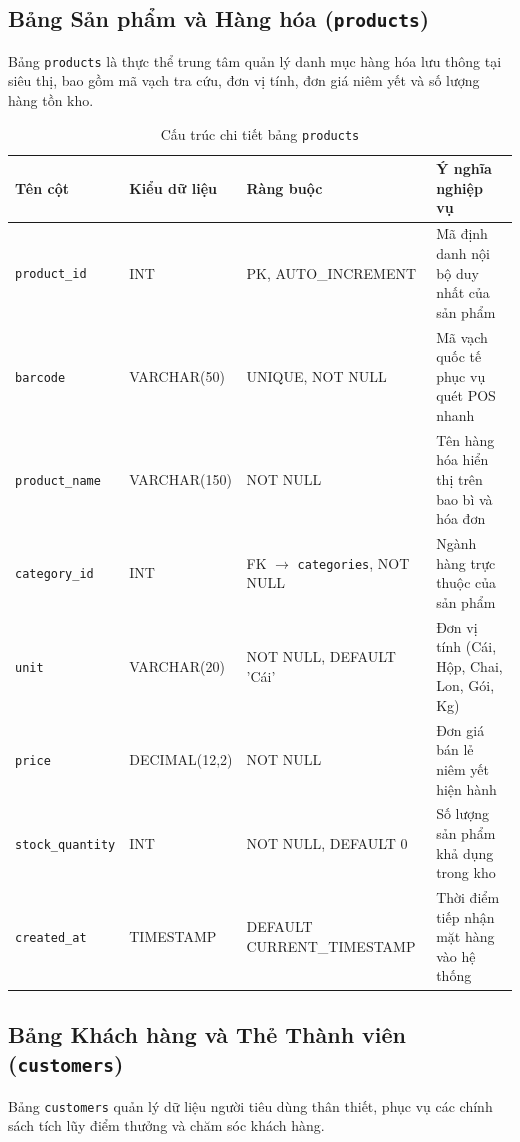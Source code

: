 \documentclass[12pt,a4paper]{report}
\begin{document}
\subsection{Bảng Sản phẩm và Hàng hóa (\texttt{products})}
Bảng \texttt{products} là thực thể trung tâm quản lý danh mục hàng hóa lưu thông tại siêu thị, bao gồm mã vạch tra cứu, đơn vị tính, đơn giá niêm yết và số lượng hàng tồn kho.

\begin{table}[H]
\centering
\footnotesize
\caption{Cấu trúc chi tiết bảng \texttt{products}}
\label{tab:dict_products}
\vspace{0.2cm}
\begin{tabularx}{\textwidth}{L{3.3cm} L{2.9cm} L{3.6cm} Y}
\toprule
\textbf{Tên cột} & \textbf{Kiểu dữ liệu} & \textbf{Ràng buộc} & \textbf{Ý nghĩa nghiệp vụ} \\
\midrule
\texttt{product\_id} & INT & PK, AUTO\_INCREMENT & Mã định danh nội bộ duy nhất của sản phẩm \\
\texttt{barcode} & VARCHAR(50) & UNIQUE, NOT NULL & Mã vạch quốc tế phục vụ quét POS nhanh \\
\texttt{product\_name} & VARCHAR(150) & NOT NULL & Tên hàng hóa hiển thị trên bao bì và hóa đơn \\
\texttt{category\_id} & INT & FK $\to$ \texttt{categories}, NOT NULL & Ngành hàng trực thuộc của sản phẩm \\
\texttt{unit} & VARCHAR(20) & NOT NULL, DEFAULT 'Cái' & Đơn vị tính (Cái, Hộp, Chai, Lon, Gói, Kg) \\
\texttt{price} & DECIMAL(12,2) & NOT NULL & Đơn giá bán lẻ niêm yết hiện hành \\
\texttt{stock\_quantity} & INT & NOT NULL, DEFAULT 0 & Số lượng sản phẩm khả dụng trong kho \\
\texttt{created\_at} & TIMESTAMP & DEFAULT CURRENT\_TIMESTAMP & Thời điểm tiếp nhận mặt hàng vào hệ thống \\
\bottomrule
\end{tabularx}
\end{table}

\subsection{Bảng Khách hàng và Thẻ Thành viên (\texttt{customers})}
Bảng \texttt{customers} quản lý dữ liệu người tiêu dùng thân thiết, phục vụ các chính sách tích lũy điểm thưởng và chăm sóc khách hàng.
\end{document}
